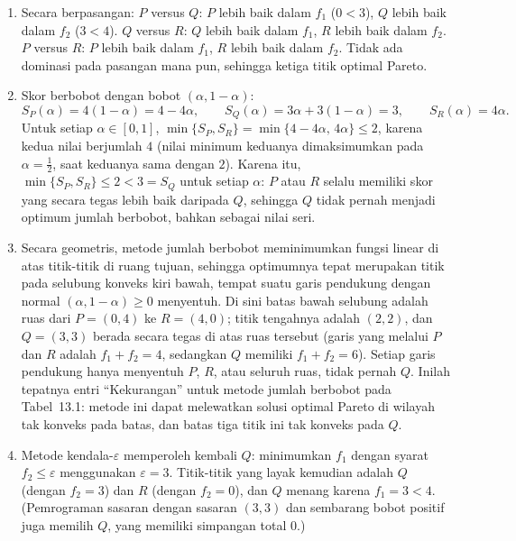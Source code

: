 \begin{enumerate}
\item Secara berpasangan: $P$ versus $Q$: $P$ lebih baik dalam $f_1$ ($0 < 3$),
$Q$ lebih baik dalam $f_2$ ($3 < 4$). $Q$ versus $R$: $Q$ lebih baik dalam
$f_1$, $R$ lebih baik dalam $f_2$. $P$ versus $R$: $P$ lebih baik dalam $f_1$,
$R$ lebih baik dalam $f_2$. Tidak ada dominasi pada pasangan mana pun, sehingga
ketiga titik optimal Pareto.
\item Skor berbobot dengan bobot $(\alpha, 1-\alpha)$:
\[
S_P(\alpha) = 4(1-\alpha) = 4 - 4\alpha, \qquad
S_Q(\alpha) = 3\alpha + 3(1-\alpha) = 3, \qquad
S_R(\alpha) = 4\alpha.
\]
Untuk setiap $\alpha \in [0,1]$,
$\min\{S_P, S_R\} = \min\{4 - 4\alpha, \, 4\alpha\} \leq 2$, karena kedua
nilai berjumlah $4$ (nilai minimum keduanya dimaksimumkan pada
$\alpha = \tfrac12$, saat keduanya sama dengan $2$). Karena itu,
$\min\{S_P, S_R\} \leq 2 < 3 = S_Q$ untuk setiap $\alpha$: $P$ atau $R$ selalu
memiliki skor yang secara tegas lebih baik daripada $Q$, sehingga $Q$ tidak
pernah menjadi optimum jumlah berbobot, bahkan sebagai nilai seri.
\item Secara geometris, metode jumlah berbobot meminimumkan fungsi linear di
atas titik-titik di ruang tujuan, sehingga optimumnya tepat merupakan titik
pada selubung konveks kiri bawah, tempat suatu garis pendukung dengan normal
$(\alpha, 1-\alpha) \geq 0$ menyentuh. Di sini batas bawah selubung adalah ruas
dari $P = (0,4)$ ke $R = (4,0)$; titik tengahnya adalah $(2,2)$, dan
$Q = (3,3)$ berada secara tegas di atas ruas tersebut (garis yang melalui $P$
dan $R$ adalah $f_1 + f_2 = 4$, sedangkan $Q$ memiliki $f_1 + f_2 = 6$).
Setiap garis pendukung hanya menyentuh $P$, $R$, atau seluruh ruas, tidak pernah
$Q$. Inilah tepatnya entri ``Kekurangan'' untuk metode jumlah berbobot pada
Tabel~13.1: metode ini dapat melewatkan solusi optimal Pareto di wilayah tak
konveks pada batas, dan batas tiga titik ini tak konveks pada $Q$.
\item Metode kendala-$\varepsilon$ memperoleh kembali $Q$: minimumkan $f_1$
dengan syarat $f_2 \leq \varepsilon$ menggunakan $\varepsilon = 3$. Titik-titik
yang layak kemudian adalah $Q$ (dengan $f_2 = 3$) dan $R$ (dengan $f_2 = 0$),
dan $Q$ menang karena $f_1 = 3 < 4$. (Pemrograman sasaran dengan sasaran $(3,3)$
dan sembarang bobot positif juga memilih $Q$, yang memiliki simpangan total $0$.)
\end{enumerate}


